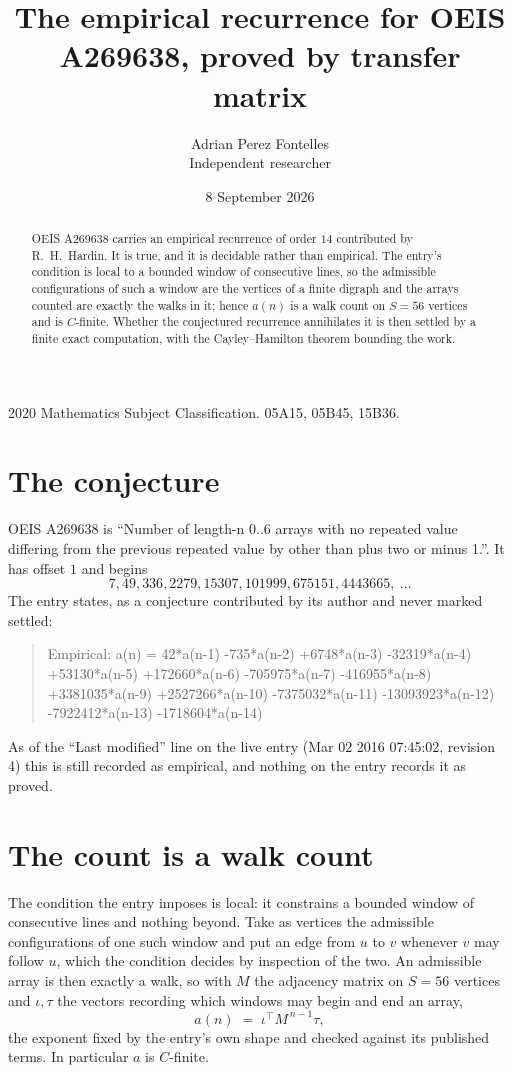 \documentclass[11pt,a4paper]{article}
\title{The empirical recurrence for OEIS A269638, proved by transfer matrix}
\author{Adrian Perez Fontelles\\ \small Independent researcher}
\date{8 September 2026}
\theoremstyle{plain}
\theoremstyle{definition}
\begin{document}
\maketitle

\begin{abstract}
OEIS A269638 carries an empirical recurrence of order $14$ contributed by R.~H.~Hardin. It is
true, and it is decidable rather than empirical. The entry's condition is local to a bounded window of consecutive lines, so
the admissible configurations of such a window are the vertices of a finite digraph and the
arrays counted are exactly the walks in it; hence $a(n)$ is a walk count on $S=56$ vertices
and is $C$-finite. Whether the conjectured recurrence annihilates it is then settled by a
finite exact computation, with the Cayley--Hamilton theorem bounding the work.
\end{abstract}

\noindent\small 2020 Mathematics Subject Classification. 05A15, 05B45, 15B36.\normalsize

\section{The conjecture}

OEIS A269638 is ``Number of length-n 0..6 arrays with no repeated value differing from the previous repeated value by other than plus two or minus 1.''. It has offset $1$ and begins
\[
7, 49, 336, 2279, 15307, 101999, 675151, 4443665,\ \dots
\]
The entry states, as a conjecture contributed by its author and never marked settled:
\begin{quote}
Empirical: a(n) = 42*a(n-1) -735*a(n-2) +6748*a(n-3) -32319*a(n-4) +53130*a(n-5) +172660*a(n-6) -705975*a(n-7) -416955*a(n-8) +3381035*a(n-9) +2527266*a(n-10) -7375032*a(n-11) -13093923*a(n-12) -7922412*a(n-13) -1718604*a(n-14)
\end{quote}
As of the ``Last modified'' line on the live entry (Mar 02 2016 07:45:02, revision 4) this is still
recorded as empirical, and nothing on the entry records it as proved.

\section{The count is a walk count}

The condition the entry imposes is local: it constrains a bounded window of consecutive lines and nothing beyond. Take as
vertices the admissible configurations of one such window and put an edge from $u$ to $v$
whenever $v$ may follow $u$, which the condition decides by inspection of the two. An
admissible array is then exactly a walk, so with $M$ the adjacency matrix on $S=56$ vertices
and $\iota,\tau$ the vectors recording which windows may begin and end an array,
\[
a(n)\;=\;\iota^{\!\top}M^{\,n-1}\tau ,
\]
the exponent fixed by the entry's own shape and checked against its published terms. In
particular $a$ is $C$-finite.
\end{document}
